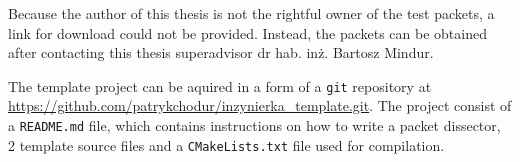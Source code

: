 \documentclass[a4paper, 11pt, twoside, openright]{article}
\begin{document}
	Because the author of this thesis is not the rightful owner of the test packets, a link for download could not be provided. Instead, the packets can be obtained
	after contacting this thesis superadvisor dr hab. inż. Bartosz Mindur.

	The template project can be aquired in a form of a \texttt{git} repository at \url{https://github.com/patrykchodur/inzynierka_template.git}.
	The project consist of a \texttt{README.md} file, which contains instructions on how to write a packet dissector, 2 template source files and a \texttt{CMakeLists.txt}
	file used for compilation.

\vspace{85mm}
\end{document}
